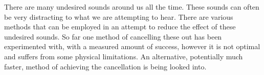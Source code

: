 \thispagestyle{plain}
There are many undesired sounds around us all the time.
These sounds can often be very distracting to what we are attempting to hear.
There are various methods that can be employed in an attempt to reduce the effect of these undesired sounds.
So far one method of cancelling these out has been experimented with, with a measured amount of success, however it is not optimal and suffers from some physical limitations.
An alternative, potentially much faster, method of achieving the cancellation is being looked into.
